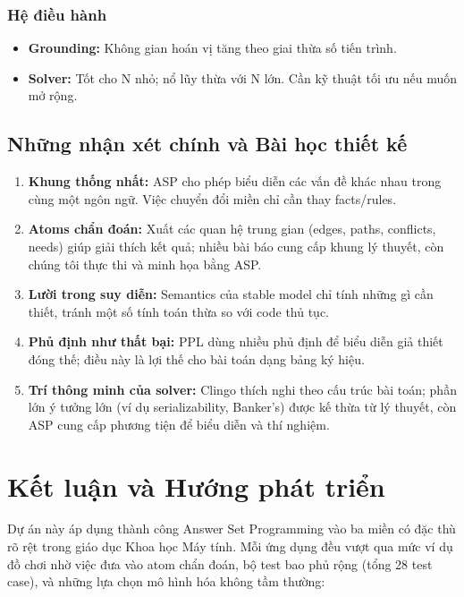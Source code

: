 \documentclass[a4paper,11pt]{article}
\begin{document}
\subsubsection*{Hệ điều hành}
\begin{itemize}
  \item \textbf{Grounding:} Không gian hoán vị tăng theo giai thừa số tiến trình.
  \item \textbf{Solver:} Tốt cho N nhỏ; nổ lũy thừa với N lớn. Cần kỹ thuật tối ưu nếu muốn mở rộng.
\end{itemize}

\subsection{Những nhận xét chính và Bài học thiết kế}
\begin{enumerate}
  \item \textbf{Khung thống nhất:} ASP cho phép biểu diễn các vấn đề khác nhau trong cùng một ngôn ngữ. Việc chuyển đổi miền chỉ cần thay facts/rules.

  \item \textbf{Atoms chẩn đoán:} Xuất các quan hệ trung gian (edges, paths, conflicts, needs) giúp giải thích kết quả; nhiều bài báo cung cấp khung lý thuyết, còn chúng tôi thực thi và minh họa bằng ASP.

  \item \textbf{Lười trong suy diễn:} Semantics của stable model chỉ tính những gì cần thiết, tránh một số tính toán thừa so với code thủ tục.

  \item \textbf{Phủ định như thất bại:} PPL dùng nhiều phủ định để biểu diễn giả thiết đóng thế; điều này là lợi thế cho bài toán dạng bảng ký hiệu.

  \item \textbf{Trí thông minh của solver:} Clingo thích nghi theo cấu trúc bài toán; phần lớn ý tưởng lớn (ví dụ serializability, Banker's) được kế thừa từ lý thuyết, còn ASP cung cấp phương tiện để biểu diễn và thí nghiệm.
\end{enumerate}

\section{Kết luận và Hướng phát triển}\label{sec:conclusion}

Dự án này áp dụng thành công Answer Set Programming vào ba miền có đặc thù rõ rệt trong giáo dục Khoa học Máy tính.
Mỗi ứng dụng đều vượt qua mức ví dụ đồ chơi nhờ việc đưa vào atom chẩn đoán, bộ test bao phủ rộng
(tổng 28 test case), và những lựa chọn mô hình hóa không tầm thường:
\end{document}
